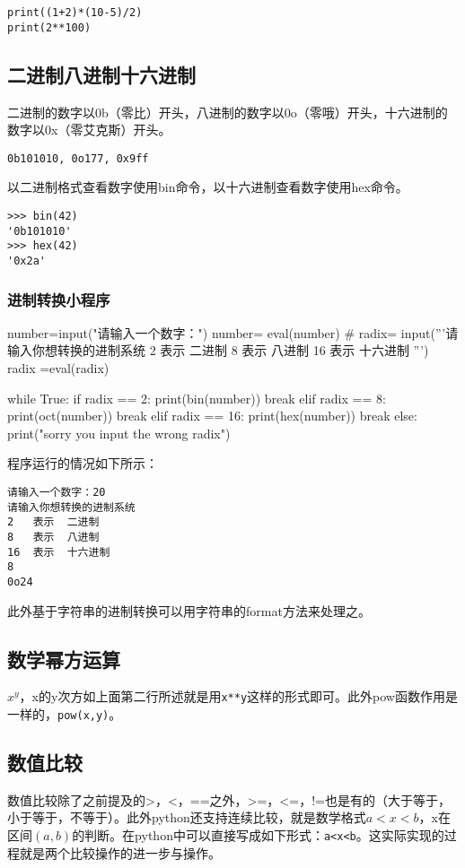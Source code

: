 \documentclass[12pt,oneside]{book}
\begin{document}
\begin{common-format}
\begin{Verbatim}
print((1+2)*(10-5)/2)
print(2**100)
\end{Verbatim}


\subsection{二进制八进制十六进制}
二进制的数字以0b（零比）开头，八进制的数字以0o（零哦）开头，十六进制的数字以0x（零艾克斯）开头。
\begin{Verbatim}
0b101010, 0o177, 0x9ff
\end{Verbatim}

以二进制格式查看数字使用bin命令，以十六进制查看数字使用hex命令。
\begin{Verbatim}
>>> bin(42)
'0b101010'
>>> hex(42)
'0x2a'
\end{Verbatim}

\subsubsection{进制转换小程序}

\begin{tcbpython}[]
number=input("请输入一个数字：")
number= eval(number)
#
radix= input('''请输入你想转换的进制系统
2   表示  二进制
8   表示  八进制
16  表示  十六进制
''')
radix =eval(radix)

while True:
    if radix == 2:
        print(bin(number))
        break
    elif radix == 8:
        print(oct(number))
        break
    elif radix == 16:
        print(hex(number))
        break
    else:
        print("sorry you input the wrong radix")
\end{tcbpython}
程序运行的情况如下所示：
\begin{Verbatim}
请输入一个数字：20
请输入你想转换的进制系统
2   表示  二进制
8   表示  八进制
16  表示  十六进制
8
0o24
\end{Verbatim}

此外基于字符串的进制转换可以用字符串的format方法来处理之。



\subsection{数学幂方运算}
$ x^y $，x的y次方如上面第二行所述就是用\verb+x**y+这样的形式即可。此外pow函数作用是一样的，\verb+pow(x,y)+。


\subsection{数值比较}
数值比较除了之前提及的>，<，==之外，>=，<=，!=也是有的（大于等于，小于等于，不等于）。此外python还支持连续比较，就是数学格式$a<x<b$，x在区间$(a,b)$的判断。在python中可以直接写成如下形式：\verb+a<x<b+。这实际实现的过程就是两个比较操作的进一步与操作。


\end{common-format}
\end{document}
